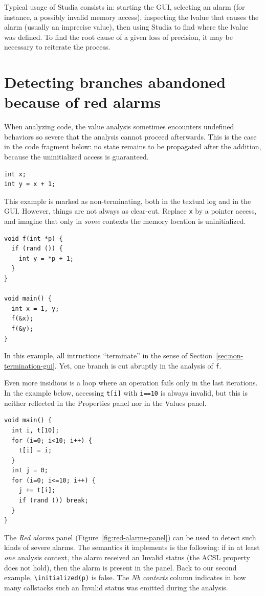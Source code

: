 Typical usage of Studia consists in: starting the GUI, selecting an alarm
(for instance, a possibly invalid memory access), inspecting the lvalue
that causes the alarm (usually an imprecise value), then using Studia to find
where the lvalue was defined. To find the root cause of a given loss of
precision, it may be necessary to reiterate the process.

\section{Detecting branches abandoned because of red alarms}
\label{red-alarms}

When analyzing code, the value analysis sometimes encounters undefined
behaviors so severe that the analysis cannot proceed afterwards.
This is the case in the code fragment below: no state remains to be
propagated after the addition, because the uninitialized access is guaranteed.

\begin{lstlisting}
int x;
int y = x + 1;
\end{lstlisting}

This example is marked as non-terminating, both in the textual log and in
the GUI.
%
However, things are not always as clear-cut. Replace \lstinline+x+ by
a pointer access, and imagine that only in \emph{some} contexts the memory
location is uninitialized.

\begin{lstlisting}
void f(int *p) {
  if (rand ()) {
    int y = *p + 1;
  }
}

void main() {
  int x = 1, y;
  f(&x);
  f(&y);
}
\end{lstlisting}
In this example, all intructions ``terminate'' in the sense of
Section~\ref{sec:non-termination-gui}. Yet, one branch is cut abruptly
in the analysis of \lstinline+f+.

Even more insidious is a loop where an operation fails only in the last
iterations. In the example below, accessing \lstinline|t[i]| with
\lstinline|i==10| is always invalid, but this is neither reflected
in the Properties panel nor in the Values panel.

\begin{lstlisting}
void main() {
  int i, t[10];
  for (i=0; i<10; i++) {
    t[i] = i;
  }
  int j = 0;
  for (i=0; i<=10; i++) {
    j += t[i];
    if (rand ()) break;
  }
}
\end{lstlisting}

The {\em Red alarms} panel (Figure~\ref{fig:red-alarms-panel}) can be used to
detect such kinds of severe alarms.
The semantics it implements is the following: if in at least \emph{one}
analysis context, the alarm received an Invalid status (the ACSL property
does not hold), then the alarm is present in the panel.
Back to our second example, \lstinline+\initialized(p)+ is false.
The \emph{Nb contexts} column indicates in how many callstacks such an Invalid
status was emitted during the analysis.

